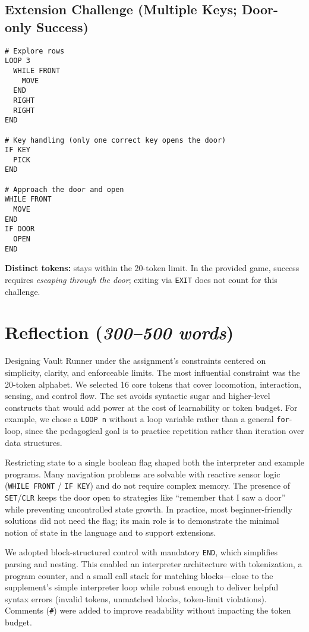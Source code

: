 \documentclass[11pt,a4paper]{article}
\begin{document}
\subsection{Extension Challenge (Multiple Keys; Door-only Success)}
\begin{lstlisting}[language=vault,caption={Systematic exploration then door escape}]
# Explore rows
LOOP 3
  WHILE FRONT
    MOVE
  END
  RIGHT
  RIGHT
END

# Key handling (only one correct key opens the door)
IF KEY
  PICK
END

# Approach the door and open
WHILE FRONT
  MOVE
END
IF DOOR
  OPEN
END
\end{lstlisting}
\textbf{Distinct tokens:} stays within the 20-token limit. In the provided game, success requires \emph{escaping through the door}; exiting via \texttt{EXIT} does not count for this challenge.

\section{Reflection (\textit{300--500 words})}
Designing Vault Runner under the assignment’s constraints centered on simplicity, clarity, and enforceable limits. The most influential constraint was the 20-token alphabet. We selected 16 core tokens that cover locomotion, interaction, sensing, and control flow. The set avoids syntactic sugar and higher-level constructs that would add power at the cost of learnability or token budget. For example, we chose a \texttt{LOOP n} without a loop variable rather than a general \texttt{for}-loop, since the pedagogical goal is to practice repetition rather than iteration over data structures.

Restricting state to a single boolean flag shaped both the interpreter and example programs. Many navigation problems are solvable with reactive sensor logic (\texttt{WHILE FRONT} / \texttt{IF KEY}) and do not require complex memory. The presence of \texttt{SET}/\texttt{CLR} keeps the door open to strategies like “remember that I saw a door” while preventing uncontrolled state growth. In practice, most beginner-friendly solutions did not need the flag; its main role is to demonstrate the minimal notion of state in the language and to support extensions.

We adopted block-structured control with mandatory \texttt{END}, which simplifies parsing and nesting. This enabled an interpreter architecture with tokenization, a program counter, and a small call stack for matching blocks—close to the supplement’s simple interpreter loop while robust enough to deliver helpful syntax errors (invalid tokens, unmatched blocks, token-limit violations). Comments (\texttt{\#}) were added to improve readability without impacting the token budget.
\end{document}
